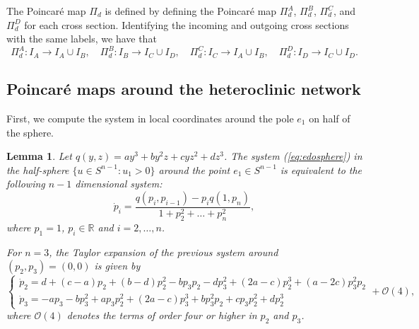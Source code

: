 \documentclass{article}
\newtheorem{lem}{Lemma}
\theoremstyle{definition}
\begin{document}
The Poincaré map $\Pi_d$ is defined by defining the Poincaré map $\Pi^A_d$, $\Pi^B_d$, $\Pi^C_d$, and $\Pi^D_d$ for each cross section. Identifying the incoming and outgoing cross sections with the same labels, we have that 
$$\Pi^A_d: I_A\to I_A\cup I_B,\quad \Pi^B_d: I_B\to I_C\cup I_D,\quad \Pi^C_d: I_C\to I_A\cup I_B,\quad \Pi^D_d: I_D\to I_C\cup I_D.$$


\subsection{Poincaré maps around the heteroclinic network}


 
First, we compute the system in local coordinates around the pole $e_1$ on half of the sphere.
 
\begin{lem}\label{lem:2dsystem}
 Let $q(y,z)=a y^3+b y^2 z+c y z^2+d z^3$.	
	The system (\ref{eq:edosphere}) in the half-sphere $\{u\in S^{n-1}:u_1>0 \}$ around the point $e_1\in S^{n-1}$ is equivalent to the following $n-1$ dimensional system:
$$\dot{p}_i=\dfrac{q(p_i,p_{i-1})-p_i q(1,p_n)}{1+p_2^2+\dots +p_n^2},$$
where $p_1=1$, $p_i\in\mathbb{R}$ and $i=2,\dots,n$.

For $n=3$, the Taylor expansion of the previous system around $(p_2,p_3)=(0,0)$ is given by 
$$\begin{cases}
\dot{p}_2 =d+(c-a)p_2+(b-d)p_2^2  -b p_3 p_2-d p_3^2+(2a-c) p_2^3 +(a-2c)p_3^2 p_2 \\
\dot{p}_3 = -a p_3- bp_3^2+a p_3 p_2^2+(2a-c)p_3^3+bp_3^2p_2+cp_3p_2^2+dp_2^3 
\end{cases}+\mathcal{O}(4),$$
where $\mathcal{O}(4)$ denotes the terms of order four or higher in $p_2$ and $p_3$.
\end{lem}
\end{document}

